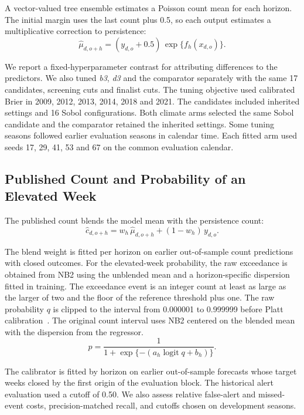 \documentclass[journal]{IEEEtran}
\newcommand{\bthree}{\textit{b3}}
\newcommand{\dthree}{\textit{d3}}
\begin{document}
A vector-valued tree ensemble estimates a Poisson count mean for each horizon. The initial margin uses the last count plus 0.5, so each output estimates a multiplicative correction to persistence:
\begin{equation}
\hat{\mu}_{d,o+h} = (y_{d,o} + 0.5)\, \exp\{ f_h(x_{d,o}) \}.
\label{eq:mu}
\end{equation}

We report a fixed-hyperparameter contrast for attributing differences to the predictors. We also tuned \bthree{}, \dthree{} and the comparator separately with the same 17 candidates, screening cuts and finalist cuts. The tuning objective used calibrated Brier in 2009, 2012, 2013, 2014, 2018 and 2021. The candidates included inherited settings and 16 Sobol configurations. Both climate arms selected the same Sobol candidate and the comparator retained the inherited settings. Some tuning seasons followed earlier evaluation seasons in calendar time. Each fitted arm used seeds 17, 29, 41, 53 and 67 on the common evaluation calendar.

\subsection{Published Count and Probability of an Elevated Week}
The published count blends the model mean with the persistence count:
\begin{equation}
\hat{c}_{d,o+h} = w_h\, \hat{\mu}_{d,o+h} + (1 - w_h)\, y_{d,o}.
\label{eq:blend}
\end{equation}

The blend weight is fitted per horizon on earlier out-of-sample count predictions with closed outcomes. For the elevated-week probability, the raw exceedance is obtained from NB2 using the unblended mean and a horizon-specific dispersion fitted in training. The exceedance event is an integer count at least as large as the larger of two and the floor of the reference threshold plus one. The raw probability $q$ is clipped to the interval from 0.000001 to 0.999999 before Platt calibration~\cite{platt1999}. The original count interval uses NB2 centered on the blended mean with the dispersion from the regressor.
\begin{equation}
p = \frac{1}{1 + \exp\{-(a_h \operatorname{logit} q + b_h)\}}.
\label{eq:platt}
\end{equation}

The calibrator is fitted by horizon on earlier out-of-sample forecasts whose target weeks closed by the first origin of the evaluation block. The historical alert evaluation used a cutoff of 0.50. We also assess relative false-alert and missed-event costs, precision-matched recall, and cutoffs chosen on development seasons.
\end{document}
